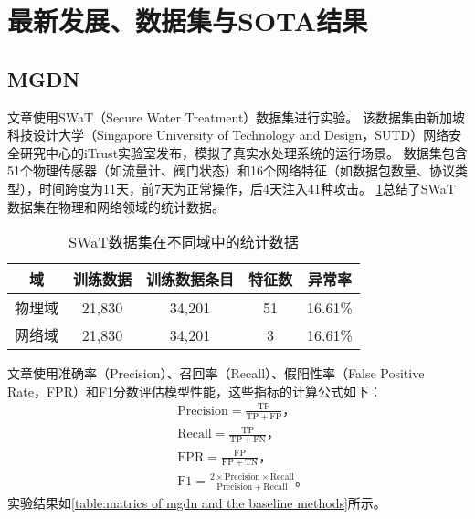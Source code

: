 \section{最新发展、数据集与SOTA结果}

\subsection{MGDN}

文章使用SWaT（Secure Water Treatment）\cite{mathur2016swat}数据集进行实验。
该数据集由新加坡科技设计大学（Singapore University of Technology and Design，SUTD）网络安全研究中心的iTrust实验室发布，模拟了真实水处理系统的运行场景。
数据集包含51个物理传感器（如流量计、阀门状态）和16个网络特征（如数据包数量、协议类型），时间跨度为11天，前7天为正常操作，后4天注入41种攻击。
\cref{table:swat static info}总结了SWaT数据集在物理和网络领域的统计数据。

\begin{table}[ht]
    \centering
    \caption{SWaT数据集在不同域中的统计数据}
    \label{table:swat static info}
    \begin{tabular}{ccccc}
        \toprule
        \textbf{域} & \textbf{训练数据} & \textbf{训练数据条目} & \textbf{特征数} & \textbf{异常率} \\
        \midrule
        物理域 & 21,830 & 34,201 & 51 & 16.61\% \\
        网络域 & 21,830 & 34,201 & 3  & 16.61\% \\
        \bottomrule
    \end{tabular}
\end{table}

文章使用准确率（Precision）、召回率（Recall）、假阳性率（False Positive Rate，FPR）和F1分数评估模型性能，这些指标的计算公式如下：
\begin{align*}
    &\mathrm{Precision}=\frac{\mathrm{TP}}{\mathrm{TP}+\mathrm{FP}} \text{，} \\
    &\mathrm{Recall}=\frac{\mathrm{TP}}{\mathrm{TP}+\mathrm{FN}} \text{，} \\
    &\mathrm{FPR}=\frac{\mathrm{FP}}{\mathrm{FP}+\mathrm{TN}} \text{，} \\
    &\mathrm{F1}=\frac{2\times\mathrm{Precision}\times\mathrm{Recall}}{\mathrm{Precision}+\mathrm{Recall}} \text{。}
\end{align*}
实验结果如\cref{table:matrics of mgdn and the baseline methods}所示。

